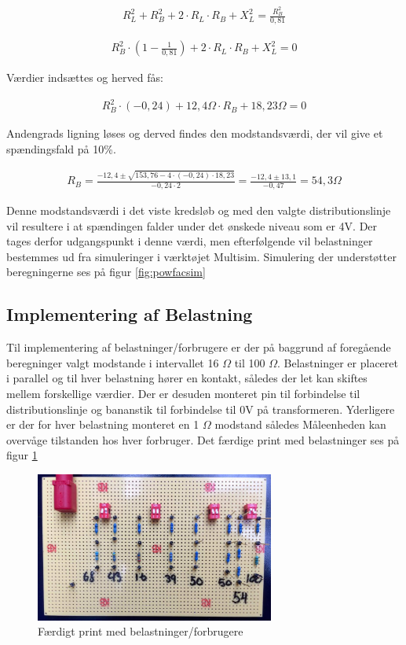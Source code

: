 \begin{align}
R_L^2+R_B^2+2\cdot R_L\cdot R_B+X_L^2=\frac{R_B^2}{0,81}
\end{align}

\begin{align}
R_B^2\cdot (1-\frac{1}{0,81})+2\cdot R_L\cdot R_B+X_L^2=0
\end{align}

Værdier indsættes og herved fås:

\begin{align}
R_B^2\cdot (-0,24) +12,4\Omega\cdot R_B+18,23\Omega=0
\end{align}

Andengrads ligning løses og derved findes den modstandsværdi, der vil give et spændingsfald på 10\%.

\begin{align}
R_B=\frac{-12,4\pm\sqrt{153,76-4\cdot(-0,24)\cdot18,23}}{-0,24\cdot 2}=\frac{-12,4\pm 13,1}{-0,47}=54,3 \Omega
\end{align}

Denne modstandsværdi i det viste kredsløb og med den valgte distributionslinje vil resultere i at spændingen falder under det ønskede niveau som er 4V. Der tages derfor udgangspunkt i denne værdi, men efterfølgende vil belastninger bestemmes ud fra simuleringer i værktøjet Multisim. Simulering der understøtter beregningerne ses på figur \ref{fig:powfacsim}

\subsection{Implementering af Belastning}
\label{subsec:implementeringAfBelastning}
Til implementering af belastninger/forbrugere er der på baggrund af foregående beregninger valgt modstande i intervallet 16 $\Omega$ til 100 $\Omega$. Belastninger er placeret i parallel og til hver belastning hører en kontakt, således der let kan skiftes mellem forskellige værdier. Der er desuden monteret pin til forbindelse til distributionslinje og bananstik til forbindelse til 0V på transformeren. Yderligere er der for hver belastning monteret en 1 $\Omega$ modstand således Måleenheden kan overvåge tilstanden hos hver forbruger. Det færdige print med belastninger ses på figur \ref{fig:Belastning1}

\begin{figure}[H] 
	\centering
	\includegraphics[width=0.7\textwidth]{Figure/Belastningskreds}
	\caption{Færdigt print med belastninger/forbrugere}
	\label{fig:Belastning1}
\end{figure}


